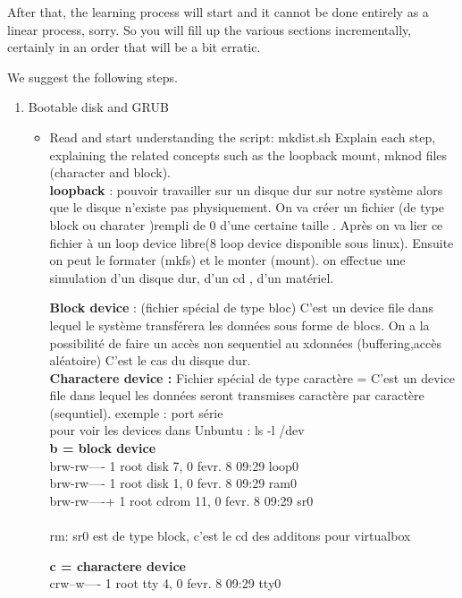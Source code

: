 \documentclass[10]{article}
\begin{document}
After that, the learning process will start and it cannot be done entirely 
as a linear process, sorry. So you will fill up the various sections
incrementally, certainly in an order that will be a bit erratic.

We suggest the following steps.

\begin{enumerate}
\item Bootable disk and GRUB
\begin{itemize}
\item Read and start understanding the script: mkdist.sh
Explain each step, explaining the related concepts such as 
the loopback mount, mknod files (character and block).\\

\textbf{loopback }: pouvoir travailler sur un disque dur sur notre syst\`eme alors que le disque n'existe pas physiquement. On va cr\'eer un fichier (de type block ou charater )rempli de 0 d'une certaine taille . Apr\`es on va lier ce fichier \`a un loop device libre(8 loop device disponible sous linux).
Ensuite on peut le formater (mkfs) et le monter (mount).
on effectue une simulation d'un disque dur, d'un cd , d'un mat\'eriel.

\textbf{Block device }: (fichier sp\'ecial de type bloc) C'est un device file dans lequel le syst\`eme transf\'erera les donn\'ees sous forme de blocs.
On a la possibilit\'e de faire un acc\`es non sequentiel au xdonn\'ees (buffering,acc\`es al\'eatoire) C'est le cas du disque dur.\\

\textbf{Charactere device :} 
Fichier sp\'ecial de type caract\`ere =
 C'est un device file dans lequel les donn\'ees seront transmises caract\`ere par caract\`ere (sequntiel). exemple : port s\'erie\\

pour voir les devices dans Unbuntu : ls -l /dev\\
\textbf{b = block device}\\
brw-rw----  1 root    disk      7,   0 fevr.  8 09:29 loop0\\
brw-rw----  1 root    disk      1,   0 fevr.  8 09:29 ram0\\ 
brw-rw----+ 1 root    cdrom    11,   0 fevr.  8 09:29 sr0\\\\
rm: sr0 est de type block, c'est le cd des additons pour virtualbox

\textbf{c = charactere device}\\
crw--w----  1 root    tty       4,   0 fevr.  8 09:29 tty0


\end{itemize}
\end{enumerate}
\end{document}
